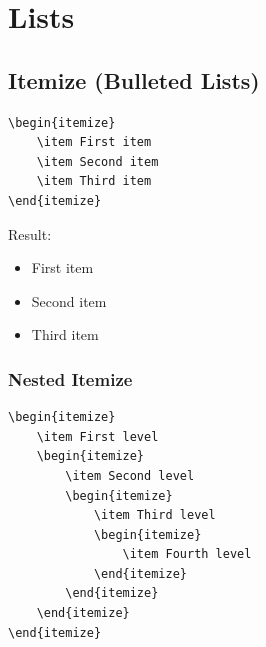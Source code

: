 
\chapter{Lists}

\section{Itemize (Bulleted Lists)}

\begin{lstlisting}[language={[LaTeX]TeX}, caption=Basic itemize list]
\begin{itemize}
    \item First item
    \item Second item
    \item Third item
\end{itemize}
\end{lstlisting}

Result:
\begin{itemize}
    \item First item
    \item Second item
    \item Third item
\end{itemize}

\subsection{Nested Itemize}

\begin{lstlisting}[language={[LaTeX]TeX}, caption=Nested itemize]
\begin{itemize}
    \item First level
    \begin{itemize}
        \item Second level
        \begin{itemize}
            \item Third level
            \begin{itemize}
                \item Fourth level
            \end{itemize}
        \end{itemize}
    \end{itemize}
\end{itemize}
\end{lstlisting}

